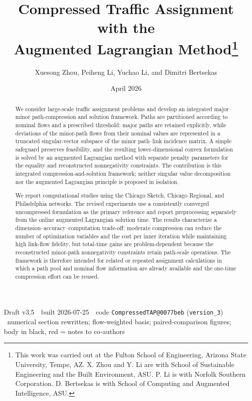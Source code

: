 \documentclass[11pt]{article}
\title{Compressed Traffic Assignment with the \\Augmented Lagrangian Method\footnote{
This work was carried out at the Fulton School of Engineering, Arizona State University, Tempe, AZ. X. Zhou and Y. Li are with School of Sustainable Engineering and the Built Environment, ASU. P. Li is with Norfolk Southern Corporation. D. Bertsekas is with School of Computing and Augmented Intelligence, ASU.}}
\author{Xuesong Zhou, Peiheng Li, Yuchao Li, and Dimitri Bertsekas}
\date{April 2026}
\makeatletter
\newcommand{\docver}{v3.5}
\newcommand{\docdate}{2026-07-25}
\newcommand{\doccommit}{0077beb}
\newcommand{\docstamp}{Draft \docver\ \textbullet\ built \docdate\ \textbullet\ code
  \texttt{CompressedTAP@\doccommit} (\texttt{version\_3}) \textbullet\ numerical section
  rewritten; flow-weighted basis; paired-comparison figures; body in black, red = notes to co-authors}
\makeatother
\begin{document}
\maketitle
\begin{center}\small\textsf{\docstamp}\end{center}

\begin{abstract}
{\color{red}
We consider large-scale traffic assignment problems and develop an integrated major--minor path-compression and solution framework. Paths are partitioned according to nominal flows and a prescribed threshold: major paths are retained explicitly, while deviations of the minor-path flows from their nominal values are represented in a truncated singular-vector subspace of the minor path--link incidence matrix. A simple safeguard preserves feasibility, and the resulting lower-dimensional convex formulation is solved by an augmented Lagrangian method with separate penalty parameters for the equality and reconstructed nonnegativity constraints. The contribution is this integrated compression-and-solution framework; neither singular value decomposition nor the augmented Lagrangian principle is proposed in isolation.

We report computational studies using the Chicago Sketch, Chicago Regional, and Philadelphia networks. The revised experiments use a consistently converged uncompressed formulation as the primary reference and report preprocessing separately from the online augmented Lagrangian solution time. The results characterize a dimension--accuracy--computation trade-off: moderate compression can reduce the number of optimization variables and the cost per inner iteration while maintaining high link-flow fidelity, but total-time gains are problem-dependent because the reconstructed minor-path nonnegativity constraints retain path-scale operations. The framework is therefore intended for related or repeated assignment calculations in which a path pool and nominal flow information are already available and the one-time compression effort can be reused.
}
\end{abstract}

\end{document}

